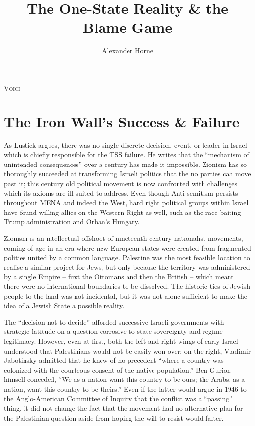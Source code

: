 \documentclass[letterpaper,12pt,twoside]{article} %
\title{\Huge The One-State Reality \& the Blame Game}
\author{\large Alexander Horne}
\date{} %
\begin{document}
\maketitle

\begin{adjustwidth}{1in}{1in}
    \lipsum[2]
\end{adjustwidth}

\begin{multicols}{2}

\lettrine[lraise=0.1, nindent=0em, slope=-.5em]{V}{oici} 

\section{The Iron Wall's Success \& Failure}

As Lustick argues, there was no single discrete decision, event, or leader in Israel which is chiefly responsible for the TSS failure. He writes that the ``mechanism of unintended consequences'' over a century has made it impossible.\autocite{lustick2019paradigm} Zionism has so thoroughly succeeded at transforming Israeli politics that the no parties can move past it; this century old political movement is now confronted with challenges which its axioms are ill-suited to address. Even though Anti-semitism persists throughout MENA and indeed the West, hard right political groups within Israel have found willing allies on the Western Right as well, such as the race-baiting Trump administration and Orban's Hungary. 

Zionism is an intellectual offshoot of nineteenth century nationalist movements, coming of age in an era where new European states were created from fragmented polities united by a common language. Palestine was the most feasible location to realise a similar project for Jews, but only because the territory was administered by a single Empire -- first the Ottomans and then the British -- which meant there were no international boundaries to be dissolved. The historic ties of Jewish people to the land was not incidental, but it was not alone sufficient to make the idea of a Jewish State a possible reality. 

The ``decision not to decide'' afforded successive Israeli governments with strategic latitude on a question corrosive to state sovereignty and regime legitimacy. However, even at first, both the left and right wings of early Israel understood that Palestinians would not be easily won over: on the right, Vladimir Jabotinsky admitted that he knew of no precedent ``where a country was colonized with the courteous consent of the native population.''\autocite[113]{caplan1978question} Ben-Gurion himself conceded, ``We as a nation want this country to be ours; the Arabs, as a nation, want this country to be theirs.''\autocite[80]{smith1988palestine} Even if the latter would argue in 1946 to the Anglo-American Committee of Inquiry that the conflict was a ``passing'' thing, it did not change the fact that the movement had no alternative plan for the Palestinian question aside from hoping the will to resist would falter. 


\end{multicols}
\end{document}
